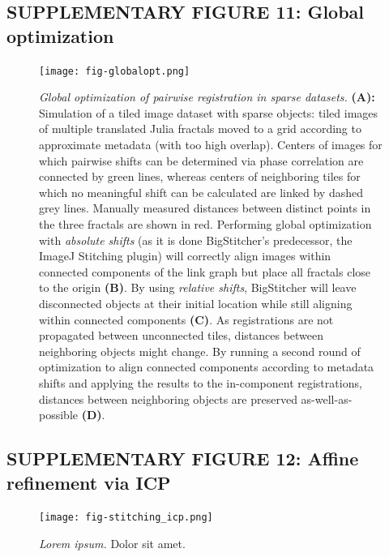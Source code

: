 \documentclass[]{spie}  %
\begin{document}
\subsection*{SUPPLEMENTARY FIGURE 11: Global optimization}
\vspace{1mm}
\begin{figure}[h!]
\centerline{\texttt{[image: fig-globalopt.png]}}
\vspace{2.0mm}
\caption{\hspace{-0.5mm} \emph{Global optimization of pairwise registration in sparse datasets.} \textbf{(A):} Simulation of a tiled image dataset with sparse objects: tiled images of multiple translated Julia fractals moved to a grid according to approximate metadata (with too high overlap). Centers of images for which pairwise shifts can be determined via phase correlation are connected by green lines, whereas centers of neighboring tiles for which no meaningful shift can be calculated are linked by dashed grey lines. Manually measured distances between distinct points in the three fractals are shown in red. Performing global optimization with \emph{absolute shifts} (as it is done BigStitcher's predecessor, the ImageJ Stitching plugin) will correctly align images within connected components of the link graph but place all fractals close to the origin \textbf{(B)}. By using \emph{relative shifts}, BigStitcher will leave disconnected objects at their initial location while still aligning within connected components \textbf{(C)}. As registrations are not propagated between unconnected tiles, distances between neighboring objects might change. By running a second round of optimization to align connected components according to metadata shifts and applying the results to the in-component registrations, distances between neighboring objects are preserved as-well-as-possible \textbf{(D)}.
}
\label{fig:sup-fig-globalopt}
\end{figure}

\pagebreak


\subsection*{SUPPLEMENTARY FIGURE 12: Affine refinement via ICP}
\vspace{1mm}
\begin{figure}[h!]
\texttt{[image: fig-stitching\_icp.png]}
\vspace{-2.0mm}
\caption{\hspace{-0.5mm} \emph{Lorem ipsum.} Dolor sit amet.
}
\label{fig:sup-fig-icp}
\end{figure}
\end{document}
